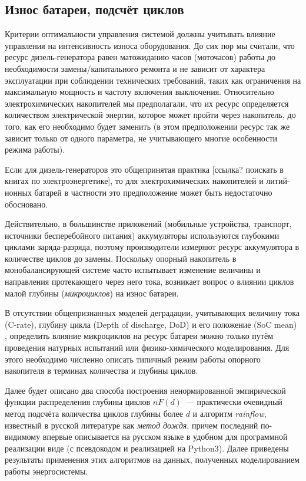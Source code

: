 \subsection{Износ батареи, подсчёт циклов}

Критерии оптимальности управления системой должны учитывать влияние управления на интенсивность износа оборудования.
До сих пор мы считали, что ресурс дизель-генератора равен матожиданию часов (моточасов) работы до необходимости замены/капитального ремонта и не зависит от характера эксплуатации при соблюдении технических требований, таких как ограничения на максимальную мощность и частоту включения выключения.
Относительно электрохимических накопителей мы предполагали, что их ресурс определяется количеством электрической энергии, которое может пройти через накопитель, до того, как его необходимо будет заменить (в этом предположении ресурс так же зависит только от одного параметра, не учитывающего многие особенности режима работы).

Если для дизель-генераторов это общепринятая практика [ссылка? поискать в книгах по электроэнергетике], то для электрохимических накопителей и литий-ионных батарей в частности это предположение может быть недостаточно обосновано.

Действительно, в большинстве приложений (мобильные устройства, транспорт, источники бесперебойного питания) аккумуляторы используются глубокими циклами заряда-разряда, поэтому производители измеряют ресурс аккумулятора в количестве циклов до замены. 
Поскольку опорный накопитель в монобалансирующей системе часто испытывает изменение величины и направления протекающего через него тока, возникает вопрос о влиянии циклов малой глубины (\textit{микроциклов}) на износ батареи.

В отсутствии общепризнанных моделей деградации, учитывающих величину тока (C-rate), глубину цикла (Depth of discharge, DoD) и его положение (SoC mean) \cite{laresgoiti2015modeling}, определить влияние микроциклов на ресурс батареи можно только путём проведения натурных испытаний или физико-химического моделирования. 
Для этого необходимо численно описать типичный режим работы опорного накопителя в терминах количества и глубины циклов.

Далее будет описано два способа построения ненормированной эмпирической функции распределения глубины циклов $nF(d)$~--- практически очевидный метод подсчёта количества циклов глубины более $d$ и алгоритм \textit{rainflow}, известный в русской литературе как \textit{метод дождя}, причем последний по-видимому впервые описывается на русском языке в удобном для программной реализации виде (с псевдокодом и реализацией на Python3).
Далее приведены результаты применения этих алгоритмов на данных, полученных моделированием работы энергосистемы.

